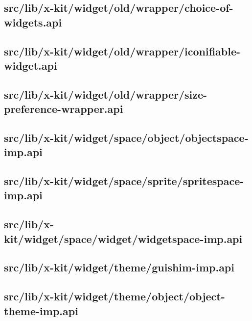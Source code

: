 \subsection{src/lib/x-kit/widget/old/wrapper/choice-of-widgets.api}


\subsection{src/lib/x-kit/widget/old/wrapper/iconifiable-widget.api}


\subsection{src/lib/x-kit/widget/old/wrapper/size-preference-wrapper.api}


\subsection{src/lib/x-kit/widget/space/object/objectspace-imp.api}


\subsection{src/lib/x-kit/widget/space/sprite/spritespace-imp.api}


\subsection{src/lib/x-kit/widget/space/widget/widgetspace-imp.api}


\subsection{src/lib/x-kit/widget/theme/guishim-imp.api}


\subsection{src/lib/x-kit/widget/theme/object/object-theme-imp.api}


